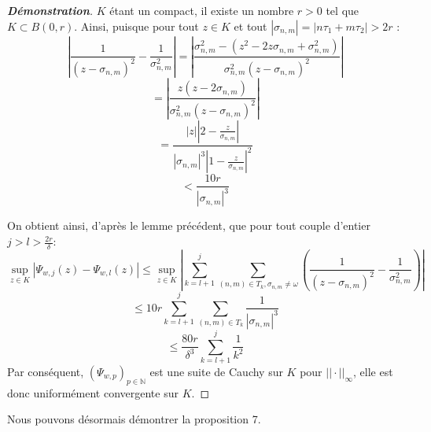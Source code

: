 \documentclass[12pt]{article}
\begin{document}
        \begin{proof}[\textbf{Démonstration}]
        \(K\) étant un compact, il existe un nombre \(r > 0\) tel que \(K \subset B(0,r)\). Ainsi, puisque pour tout \(z \in K\) et tout \(|\sigma_{n,m}| = |n \tau_1 + m \tau_2| > 2r\) :
        \[
        \left| \frac{1}{(z - \sigma_{n,m})^2} - \frac{1}{\sigma_{n,m}^2} \right| = \left| \frac{\sigma_{n,m}^2 - (z^2 - 2z\sigma_{n,m} + \sigma_{n,m}^2)}{\sigma_{n,m}^2 (z - \sigma_{n,m})^2} \right|
        \]
        \[
        = \left| \frac{z(z - 2\sigma_{n,m})}{\sigma_{n,m}^2 (z - \sigma_{n,m})^2} \right|
        \]
        \[
        = \frac{|z| \left| 2 - \frac{z}{\sigma_{n,m}} \right|}{|\sigma_{n,m}|^3 \left| 1 - \frac{z}{\sigma_{n,m}} \right|^2} 
        \]
        \[
        < \frac{10r}{|\sigma_{n,m}|^3}
        \]
        
        On obtient ainsi, d'après le lemme précédent, que pour tout couple d'entier \( j > l > \frac{2r}{\delta} \):
        \[
        \sup_{z \in K} | \Psi_{w,j}(z) - \Psi_{w,l}(z) | \leq \sup_{z \in K} \left| \sum_{k=l+1}^{j} \sum_{(n,m) \in T_k, \sigma_{n,m} \neq \omega} \left( \frac{1}{(z - \sigma_{n,m})^2} - \frac{1}{\sigma_{n,m}^2} \right) \right|
        \]
        \[
        \leq 10r \sum_{k=l+1}^{j} \sum_{(n,m) \in T_k} \frac{1}{|\sigma_{n,m}|^3}
        \]
        \[
        \leq \frac{80r}{\delta^3} \sum_{k=l+1}^{j} \frac{1}{k^2}
        \]
        Par conséquent, \((\Psi_{w,p})_{p \in \mathbb{N}}\) est une suite de Cauchy sur \(K\) pour \(||\cdot||_{\infty}\), elle est donc uniformément convergente sur \(K\).
        \end{proof}
        
        Nous pouvons désormais démontrer la proposition 7.
        
\end{document}

